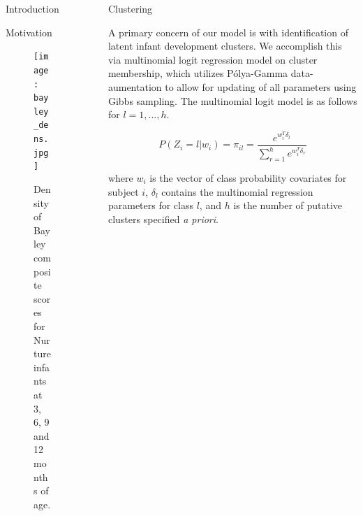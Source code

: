 \documentclass[final]{beamer}
\newlength{\sepwid}
\newlength{\onecolwid}
\newlength{\twocolwid}
\begin{document}
\begin{frame}[t]
\begin{columns}[t]
\begin{column}{\onecolwid}
\begin{block}{Introduction}
\end{block}


\begin{block}{Motivation}
\begin{figure}
\texttt{[image: bayley\_dens.jpg]}
\caption{Density of Bayley composite scores for Nurture infants at 3, 6, 9 and 12 months of age.}
\end{figure}
\end{block}


\end{column} %

\begin{column}{\sepwid}\end{column} %

\begin{column}{\twocolwid} %

\begin{columns}[t,totalwidth=\twocolwid] %

\begin{column}{\onecolwid}\vspace{-.6in} %

%	

\begin{block}{Clustering}

A primary concern of our model is with identification of latent infant development clusters. We accomplish this via multinomial logit regression model on cluster membership, which utilizes P\'{o}lya-Gamma data-aumentation to allow for updating of all parameters using Gibbs sampling. The multinomial logit model is as follows for $l = 1,...,h$.

$$P(Z_i = l|w_i) = \pi_{il} = \frac{e^{w_i^T \delta_l}}{\sum_{r = 1}^h e^{w_i^T \delta_r}}$$

where $w_i$ is the vector of class probability covariates for subject $i$, $\delta_l$ contains the multinomial regression parameters for class $l$, and $h$ is the number of putative clusters specified \textit{a priori}.


\end{block}
\end{column}
\end{columns}
\end{column}
\end{columns}
\end{frame}
\end{document}
